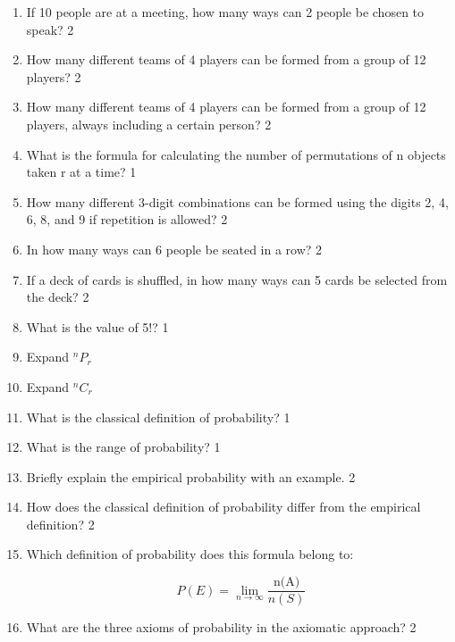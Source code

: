\documentclass[a4paper,oneside]{book}
\begin{document}
\begin{enumerate}
\item If 10 people are at a meeting, how many ways can 2 people be chosen to speak? \hfill 2

\item How many different teams of 4 players can be formed from a group of 12 players? \hfill 2

\item How many different teams of 4 players can be formed from a group of 12 players, always including a certain person? \hfill 2

\item What is the formula for calculating the number of permutations of n objects taken r at a time? \hfill 1

\item How many different 3-digit combinations can be formed using the digits 2, 4, 6, 8, and 9 if repetition is allowed? \hfill 2

\item In how many ways can 6 people be seated in a row? \hfill 2

\item If a deck of cards is shuffled, in how many ways can 5 cards be selected from the deck? \hfill 2

\item What is the value of 5!? \hfill 1

\item Expand ${}^nP_r$

\item Expand ${}^nC_r$

\item What is the classical definition of probability? \hfill 1

\item What is the range of probability? \hfill 1

\item Briefly explain the empirical probability with an example. \hfill 2

\item How does the classical definition of probability differ from the empirical definition? \hfill 2

\item Which definition of probability does this formula belong to: 

\[
P(E) = \lim_{n \to \infty} \frac{\text{n(A)}}{n(S)}
\]

\item What are the three axioms of probability in the axiomatic approach? \hfill 2


\end{enumerate}
\end{document}
